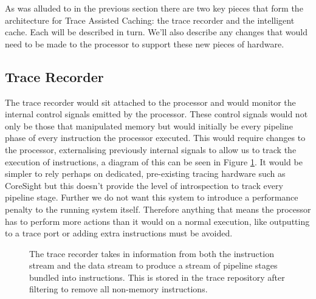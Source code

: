 As was alluded to in the previous section there are two key pieces that form the architecture for Trace Assisted Caching: the trace recorder and the intelligent cache. Each will be described in turn. We'll also describe any changes that would need to be made to the processor to support these new pieces of hardware.

\subsection{Trace Recorder}

The trace recorder would sit attached to the processor and would monitor the internal control signals emitted by the processor. These control signals would not only be those that manipulated memory but would initially be every pipeline phase of every instruction the processor executed. This would require changes to the processor, externalising previously internal signals to allow us to track the execution of instructions, a diagram of this can be seen in Figure \ref{fig:base-architecture-with-recorder}. It would be simpler to rely perhaps on dedicated, pre-existing tracing hardware such as CoreSight but this doesn't provide the level of introspection to track every pipeline stage. Further we do not want this system to introduce a performance penalty to the running system itself. Therefore anything that means the processor has to perform more actions than it would on a normal execution, like outputting to a trace port or adding extra instructions must be avoided. 


\begin{figure}[htbp]
	
	\caption[Basic Architecture with Trace Recorder]{The trace recorder takes in information from both the instruction stream and the data stream to produce a stream of pipeline stages bundled into instructions. This is stored in the trace repository after filtering to remove all non-memory instructions.}
	\label{fig:base-architecture-with-recorder}
\end{figure}

